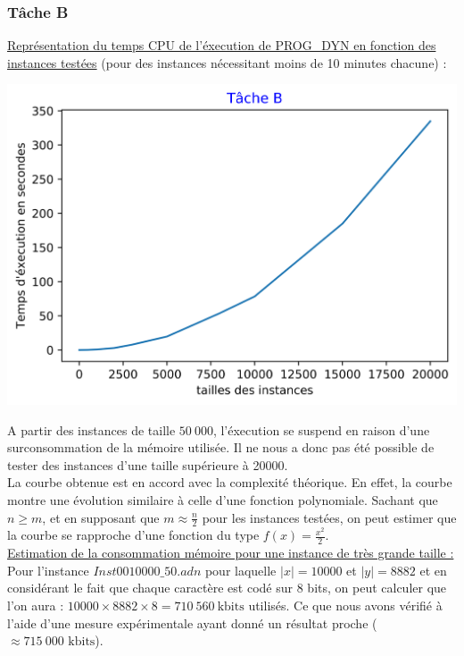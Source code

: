 \documentclass[12pt, a4paper]{report}
\begin{document}
\subsubsection{Tâche B}
\underline{Représentation du temps CPU de l'éxecution de PROG\_DYN en fonction des instances testées} (pour des instances nécessitant moins de 10 minutes chacune) :\\
\begin{center}
\includegraphics[scale=0.75]{TB.png}
\end{center}
A partir des instances de taille $50\ 000$, l'éxecution se suspend en raison d'une surconsommation de la mémoire utilisée. Il ne nous a donc pas été possible de tester des instances d'une taille supérieure à 20000.\\
La courbe obtenue est en accord avec la complexité théorique. En effet, la courbe montre une évolution similaire à celle d'une fonction polynomiale. Sachant que $n\geq m$, et en supposant que $m\approx \frac{n}{2}$ pour les instances testées, on peut estimer que la courbe se rapproche d'une fonction du type $f(x)=\frac{x^{2}}{2}$.\\
\underline{Estimation de la consommation mémoire pour une instance de très grande taille :}\\
Pour l'instance $Inst0010000\_50.adn$ pour laquelle $|x|=10000$ et $|y|=8882$ et en considérant le fait que chaque caractère est codé sur $8$ bits, on peut calculer que l'on aura : $10000\times 8882 \times 8= 710\ 560\  \text{kbits}$ utilisés. Ce que nous avons vérifié à l'aide d'une mesure expérimentale ayant donné un résultat proche ($\approx 715\ 000 \text{ kbits}$).\\
\end{document}
